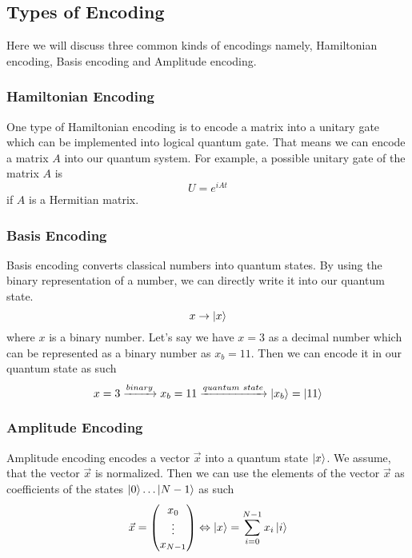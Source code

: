 \subsection{Types of Encoding}
\label{sec:types-encoding}
Here we will discuss three common kinds of encodings namely, Hamiltonian encoding, Basis encoding and Amplitude encoding.

\subsubsection{Hamiltonian Encoding}
One type of Hamiltonian encoding is to encode a matrix into a unitary gate which can be implemented into logical quantum gate. 
That means we can encode a matrix $A$ into our quantum system.
For example, a possible unitary gate of the matrix $A$ is
\begin{equation}
    U = e^{iAt}
\end{equation}
if $A$ is a Hermitian matrix.

\subsubsection{Basis Encoding}
Basis encoding converts classical numbers into quantum states.
By using the binary representation of a number, we can directly write it into our quantum state. 
\begin{equation}
    x \rightarrow \ket {x}
\end{equation}
where $x$ is a binary number.
Let's say we have $x=3$ as a decimal number which can be represented as a binary number as $x_b = 11$.
Then we can encode it in our quantum state as such
\begin{equation}
    x=3 \xrightarrow[]{binary} x_b = 11 \xrightarrow[]{quantum\  state} \ket{x_b} = \ket{11}
\end{equation}

\subsubsection{Amplitude Encoding}
Amplitude encoding encodes a vector $\vec x$ into a quantum state $\ket x$. 
We assume, that the vector $\vec x$ is normalized. 
Then we can use the elements of the vector $\vec x$ as coefficients of the states $\ket 0 \dots \ket {N-1}$ as such
\begin{equation}
    \vec{x} = \begin{pmatrix} x_0\\ \vdots \\ x_{N-1} \end{pmatrix} 
    \Leftrightarrow  
     \ket x = \sum_{i=0}^{N-1} x_i \ket i
\end{equation}

